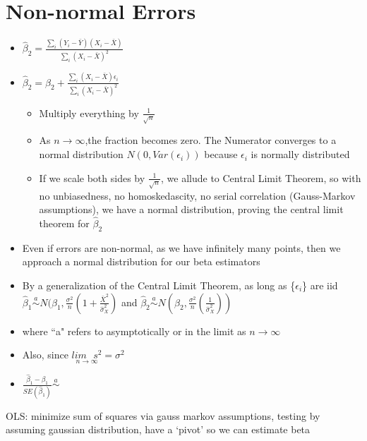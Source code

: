 \documentclass[10pt, oneside]{article}
\begin{document}
\section{Non-normal Errors}
\begin{itemize}
    \item $\hat \beta_2 = \frac{\sum_i (Y_i - \bar Y)(X_i - \bar X)}{\sum _i (X_i -\bar X)^2}$
    \item $\hat \beta_2 = \beta_2 + \frac{\sum_i (X_i - \bar X) \epsilon_i}{ \sum_i (X_i - \bar X)^2}$
    \begin{itemize}
        \item Multiply everything by $\frac{1}{\sqrt n}$
        \item As $n\rightarrow \infty$,the fraction becomes zero. The Numerator converges to a normal distribution $N(0, Var(\epsilon_i))$ because $\epsilon_i$ is normally distributed
        \item If we scale both sides by $\frac{1}{\sqrt n}$, we allude to Central Limit Theorem, so with no unbiasedness, no homoskedascity, no serial correlation (Gauss-Markov assumptions), we have a normal distribution, proving the central limit theorem for $\hat \beta_2$
    \end{itemize}
    \item Even if errors are non-normal, as we have infinitely many points, then we approach a normal distribution for our beta estimators
    \item By a generalization of the Central Limit Theorem, as long as \{$\epsilon_i$\} are iid\\
    $\hat \beta_1 \overset{a}{\sim} N(\beta_1, \frac{\sigma^2}{n}(1+ \frac{\bar X^2}{\hat \sigma^2 _X})$ and $\hat \beta_2 \overset{a}{\sim} N(\beta_2, \frac{\sigma^2}{n} (\frac{1}{\hat \sigma^2 _X}))$
    \item where ``a" refers to asymptotically or in the limit as $n\rightarrow \infty$
    \item Also, since $\underset{n\rightarrow \infty}{lim \text{ }s^2} = \sigma^2$
    \item $\frac{\hat \beta_1 -\beta_1}{SE(\hat \beta_1)} \overset{a}{\sim}$
\end{itemize}

OLS: minimize sum of squares via gauss markov assumptions, testing by assuming gaussian distribution, have a `pivot' so we can estimate beta
\end{document}
